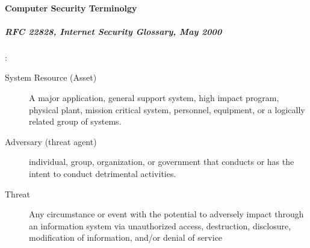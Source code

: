 \documentclass{article}
\begin{document}
            \paragraph{Computer Security Terminolgy}
                    \subparagraph{RFC 22828, Internet Security Glossary, May 2000}:\\

                    \begin{description}
                        \item[System Resource (Asset)] A major application, general support system, high impact program, physical plant, mission critical system, personnel, equipment, or a logically related group of systems.
                        \item[Adversary (threat agent)] individual, group, organization, or government that conducts or has the intent to conduct detrimental activities.
                        \item[Threat] Any circumstance or event with the potential to adversely impact  through an information system via unauthorized access, destruction, disclosure, modification of information, and/or denial of service


\end{description}
\end{document}

